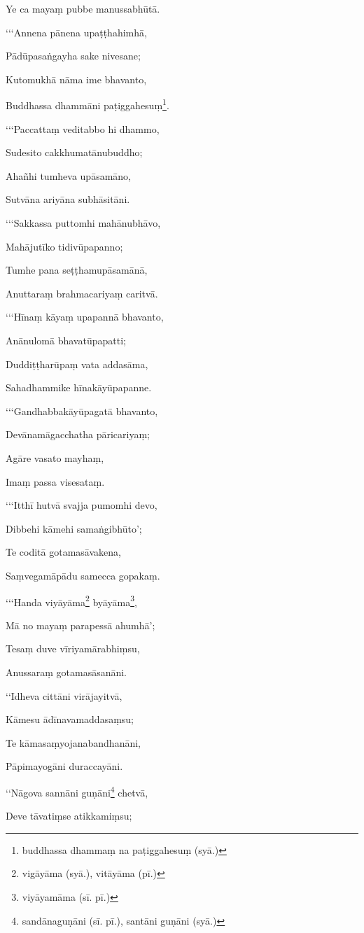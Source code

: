 Ye ca mayaṃ pubbe manussabhūtā.

‘‘‘Annena pānena upaṭṭhahimhā,

Pādūpasaṅgayha sake nivesane;

Kutomukhā nāma ime bhavanto,

Buddhassa dhammāni paṭiggahesuṃ\footnote{buddhassa dhammaṃ na paṭiggahesuṃ (syā.)}.

‘‘‘Paccattaṃ veditabbo hi dhammo,

Sudesito cakkhumatānubuddho;

Ahañhi tumheva upāsamāno,

Sutvāna ariyāna subhāsitāni.

‘‘‘Sakkassa puttomhi mahānubhāvo,

Mahājutīko tidivūpapanno;

Tumhe pana seṭṭhamupāsamānā,

Anuttaraṃ brahmacariyaṃ caritvā.

‘‘‘Hīnaṃ kāyaṃ upapannā bhavanto,

Anānulomā bhavatūpapatti;

Duddiṭṭharūpaṃ vata addasāma,

Sahadhammike hīnakāyūpapanne.

‘‘‘Gandhabbakāyūpagatā bhavanto,

Devānamāgacchatha pāricariyaṃ;

Agāre vasato mayhaṃ,

Imaṃ passa visesataṃ.

‘‘‘Itthī hutvā svajja pumomhi devo,

Dibbehi kāmehi samaṅgibhūto’;

Te coditā gotamasāvakena,

Saṃvegamāpādu samecca gopakaṃ.

‘‘‘Handa viyāyāma\footnote{vigāyāma (syā.), vitāyāma (pī.)} byāyāma\footnote{viyāyamāma (sī. pī.)},

Mā no mayaṃ parapessā ahumhā’;

Tesaṃ duve vīriyamārabhiṃsu,

Anussaraṃ gotamasāsanāni.

‘‘Idheva cittāni virājayitvā,

Kāmesu ādīnavamaddasaṃsu;

Te kāmasaṃyojanabandhanāni,

Pāpimayogāni duraccayāni.

‘‘Nāgova sannāni guṇāni\footnote{sandānaguṇāni (sī. pī.), santāni guṇāni (syā.)} chetvā,

Deve tāvatiṃse atikkamiṃsu;

